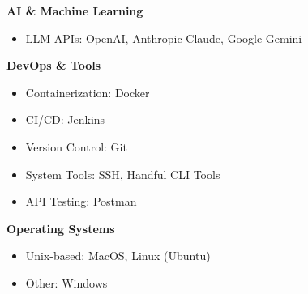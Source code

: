 \begin{itemize}[leftmargin=*, itemsep=0.1em, label={}]
	\textbf{AI \& Machine Learning}
	\begin{itemize}
		\item LLM APIs: OpenAI, Anthropic Claude, Google Gemini
	\end{itemize}
	
	\textbf{DevOps \& Tools}
	\begin{itemize}
		\item Containerization: Docker
		\item CI/CD: Jenkins
		\item Version Control: Git
		\item System Tools: SSH, Handful CLI Tools
		\item API Testing: Postman
	\end{itemize}
	
	\textbf{Operating Systems}
	\begin{itemize}
		\item Unix-based: MacOS, Linux (Ubuntu)
		\item Other: Windows
	\end{itemize}
\end{itemize}